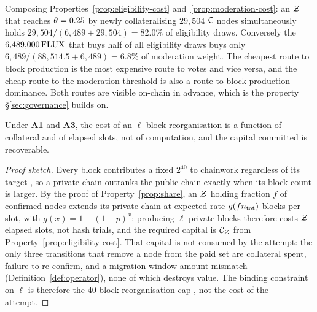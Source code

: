 \begin{remark}
\label{rem:cross-price}
Composing Properties~\ref{prop:eligibility-cost} and~\ref{prop:moderation-cost}: an $\mathcal{Z}$ that
reaches $\theta = 0.25$ by newly collateralising $29{,}504$ $\mathsf{C}$ nodes simultaneously holds
$29{,}504/(6{,}489+29{,}504) = 82.0\%$ of eligibility draws. Conversely the $6{,}489{,}000\,\mathrm{FLUX}$ that
buys half of all eligibility draws buys only $6{,}489/(88{,}514.5+6{,}489) = 6.8\%$ of moderation
weight. The cheapest route to block production is the most expensive route to votes and vice versa,
and the cheap route to the moderation threshold is also a route to block-production dominance. Both
routes are visible on-chain in advance, which is the property \S\ref{sec:governance} builds on.
\end{remark}

\begin{property}
\label{prop:reorg}
\shipped Under \textbf{A1} and \textbf{A3}, the cost of an $\ell$-block reorganisation is a function
of collateral and of elapsed slots, not of computation, and the capital committed is recoverable.
\end{property}

\begin{proof}[Proof sketch]
Every \PoN{} block contributes a fixed $2^{40}$ to chainwork regardless of its target
, so a private chain outranks the public chain exactly when its
block count is larger. By the proof of Property~\ref{prop:share}, an $\mathcal{Z}$ holding fraction $f$ of
confirmed nodes extends its private chain at expected rate $g(fn_{\mathrm{tot}})$ blocks per
slot, with $g(x)=1-(1-p)^x$; producing $\ell$ private blocks therefore costs $\mathcal{Z}$ elapsed slots,
not hash trials, and the required capital is $\mathcal{C}_{\mathcal{Z}}$ from
Property~\ref{prop:eligibility-cost}. That capital is not consumed by the attempt: the only three
transitions that remove a node from the paid set are collateral spent, failure to re-confirm, and a
migration-window amount mismatch (Definition~\ref{def:operator}), none of which destroys value. The
binding constraint on $\ell$ is therefore the $40$-block reorganisation cap
, not the cost of the attempt.
\end{proof}

